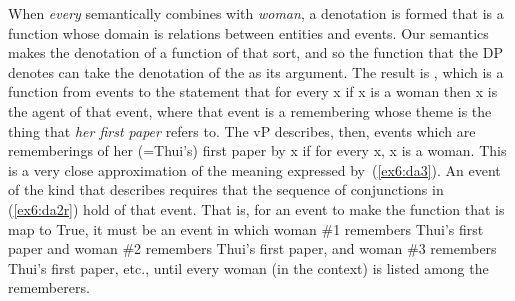 \medskip
When \emph{every} semantically combines with \emph{woman}, a denotation is formed that is a function whose domain is relations between entities and events. Our semantics makes the denotation of  a function of that sort, and so the function that the DP denotes can take the denotation of the  as its argument. The result is , which is a function from events to the statement that for every x if x is a woman then x is the agent of that event, where that event is a remembering whose theme is the thing that \emph{her first paper} refers to. The vP describes, then, events which are rememberings of her (=Thui's) first paper by x if for every x, x is a woman. This is a very close approximation of the meaning expressed by~(\ref{ex6:da3}). %
%
%
%
An event of the kind that  describes requires that the sequence of conjunctions in (\ref{ex6:da2r}) hold of that event. That is, for an event to make the function that  is map to True, it must be an event in which woman \#1 remembers Thui's first paper and woman \#2 remembers Thui's first paper, and woman \#3 remembers Thui's first paper, etc., until every woman (in the context) is listed among the rememberers.

